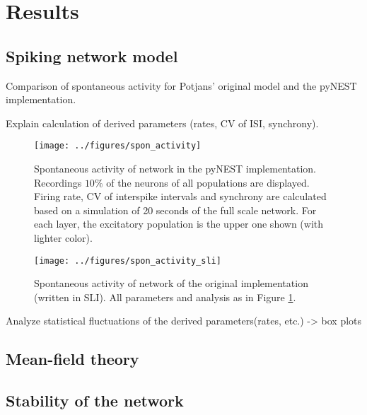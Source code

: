 \section{Results}
\label{sec:results}

\subsection{Spiking network model}
Comparison of spontaneous activity for Potjans' original model and 
the pyNEST implementation. 

Explain calculation of derived parameters (rates, CV of ISI, synchrony).



\begin{figure}[htpb]
    \centering
    \texttt{[image: ../figures/spon\_activity]}
    \caption{Spontaneous activity of network in the pyNEST implementation. 
        Recordings $10\%$ of the neurons of all populations are displayed.
        Firing rate, CV of interspike intervals and synchrony are calculated 
        based on a simulation of 20 seconds of the full scale network. For 
        each layer, the excitatory population is the upper one shown 
        (with lighter color).
    }
    \label{fig:spon_activity}
\end{figure}
\begin{figure}[htpb]
    \centering
    \texttt{[image: ../figures/spon\_activity\_sli]}
    \caption{Spontaneous activity of network of the original implementation (written in SLI). 
        All parameters and analysis as in Figure \ref{fig:spon_activity}.
    }
    \label{fig:spon_activity_sli}
\end{figure}

Analyze statistical fluctuations of the derived parameters(rates, etc.) 
-> box plots

\subsection{Mean-field theory}

\subsection{Stability of the network}
